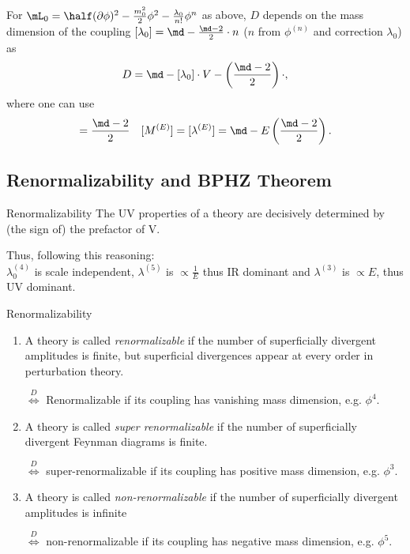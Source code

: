 For $\mL_0 = \half (\partial \phi)^2 - \frac{m^2_0}{2} \phi^2 - \frac{\lambda_0}{n!} \phi^n$ as above, $D$ depends on the mass dimension of the coupling $[\lambda_0] = \md - \frac{\md-2}{2} \cdot n$ ($n$ from $\phi^{(n)}$ and correction $\lambda_0$) as 
\begin{equation}
	D = \md - [\lambda_0] \cdot V - \left(\frac{\md-2}{2}\right) \cdot,
\end{equation}
where one can use
\begin{equation}
	[\phi] = \frac{\md-2}{2} \quad [M^{(E)}] = [\lambda^{(E)}] = \md -E\left(\frac{\md-2}{2}\right).
\end{equation}



\subsection{Renormalizability and BPHZ Theorem}
\begin{mybox}{Renormalizability}
	The UV properties of a theory are decisively determined by (the sign of) the prefactor of V.
\end{mybox}
Thus, following this reasoning:\\
$\lambda^{(4)}_0$ is scale independent, $\lambda^{(5)}$ is $\propto \frac{1}{E}$ thus IR dominant and $\lambda^{(3)}$ is $\propto E$, thus UV dominant.
\begin{mybox}{Renormalizability}
	\begin{enumerate}
		\item
	A theory is called \emph{renormalizable} if the number of superficially divergent amplitudes is finite, but superficial divergences appear at every order in perturbation theory.
	\begin{statements}
		$\stackrel{D}{\Leftrightarrow}$ Renormalizable if its coupling has vanishing mass dimension, e.g. $\phi^4$.
	\end{statements}
\item A theory is called \emph{super renormalizable} if the number of superficially divergent Feynman diagrams is finite.
\begin{statements}
	$\stackrel{D}{\Leftrightarrow}$ super-renormalizable if its coupling has positive mass dimension, e.g. $\phi^3$.
\end{statements}
\item A theory is called \emph{non-renormalizable} if the number of superficially divergent amplitudes is infinite
\begin{statements}
	$\stackrel{D}{\Leftrightarrow}$ non-renormalizable if its coupling has negative mass dimension, e.g. $\phi^5$.
\end{statements}
\end{enumerate}
\end{mybox}
